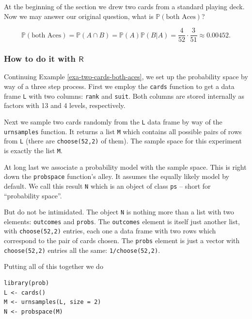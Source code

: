 \documentclass[captions=tableheading]{scrbook}
\begin{document}
\begin{example}
At the beginning of the section we drew two cards from a standard playing deck. Now we may answer our original question, what is \(\mathbb{P}(\mbox{both Aces})\)?

\[
\mathbb{P}(\mbox{both Aces})=\mathbb{P}(A\cap B)=\mathbb{P}(A)\mathbb{P}(B|A)=\frac{4}{52}\cdot\frac{3}{51}\approx0.00452.
\]

\end{example}
\subsubsection{How to do it with \(\mathsf{R}\)}
\label{sec-4-6-2-1}
\label{sub-howto-ps-objects}


Continuing Example \ref{exa-two-cards-both-aces}, we set up the probability space by way of a three step process. First we employ the \texttt{cards} function to get a data frame \texttt{L} with two columns: \texttt{rank} and \texttt{suit}. Both columns are stored internally as factors with 13 and 4 levels, respectively.

Next we sample two cards randomly from the \texttt{L} data frame by way of the \texttt{urnsamples} function. It returns a list \texttt{M} which contains all possible pairs of rows from \texttt{L} (there are \texttt{choose(52,2)} of them). The sample space for this experiment is exactly the list \texttt{M}.

At long last we associate a probability model with the sample space. This is right down the \texttt{probspace} function's alley. It assumes the equally likely model by default. We call this result \texttt{N} which is an object of class \texttt{ps} -- short for ``probability space''.

But do not be intimidated. The object \texttt{N} is nothing more than a list with two elements: \texttt{outcomes} and \texttt{probs}. The \texttt{outcomes} element is itself just another list, with \texttt{choose(52,2)} entries, each one a data frame with two rows which correspond to the pair of cards chosen. The \texttt{probs} element is just a vector with \texttt{choose(52,2)} entries all the same: \texttt{1/choose(52,2)}.

Putting all of this together we do 


\lstset{language=R}
\begin{lstlisting}
library(prob)
L <- cards()
M <- urnsamples(L, size = 2)
N <- probspace(M)
\end{lstlisting}
\end{document}
